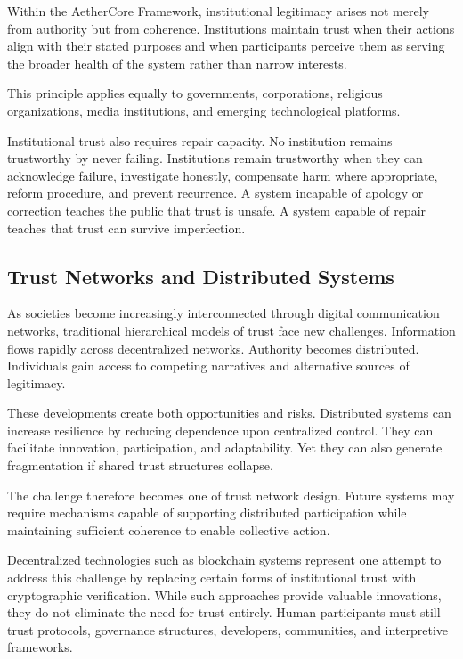 \documentclass[12pt]{article}
\begin{document}
Within the AetherCore Framework, institutional legitimacy arises not merely from authority but from coherence. Institutions maintain trust when their actions align with their stated purposes and when participants perceive them as serving the broader health of the system rather than narrow interests.

This principle applies equally to governments, corporations, religious organizations, media institutions, and emerging technological platforms.

Institutional trust also requires repair capacity. No institution remains trustworthy by never failing. Institutions remain trustworthy when they can acknowledge failure, investigate honestly, compensate harm where appropriate, reform procedure, and prevent recurrence. A system incapable of apology or correction teaches the public that trust is unsafe. A system capable of repair teaches that trust can survive imperfection.

\subsection{Trust Networks and Distributed Systems}

As societies become increasingly interconnected through digital communication networks, traditional hierarchical models of trust face new challenges. Information flows rapidly across decentralized networks. Authority becomes distributed. Individuals gain access to competing narratives and alternative sources of legitimacy.

These developments create both opportunities and risks. Distributed systems can increase resilience by reducing dependence upon centralized control. They can facilitate innovation, participation, and adaptability. Yet they can also generate fragmentation if shared trust structures collapse.

The challenge therefore becomes one of trust network design. Future systems may require mechanisms capable of supporting distributed participation while maintaining sufficient coherence to enable collective action.

Decentralized technologies such as blockchain systems represent one attempt to address this challenge by replacing certain forms of institutional trust with cryptographic verification. While such approaches provide valuable innovations, they do not eliminate the need for trust entirely. Human participants must still trust protocols, governance structures, developers, communities, and interpretive frameworks.
\end{document}
